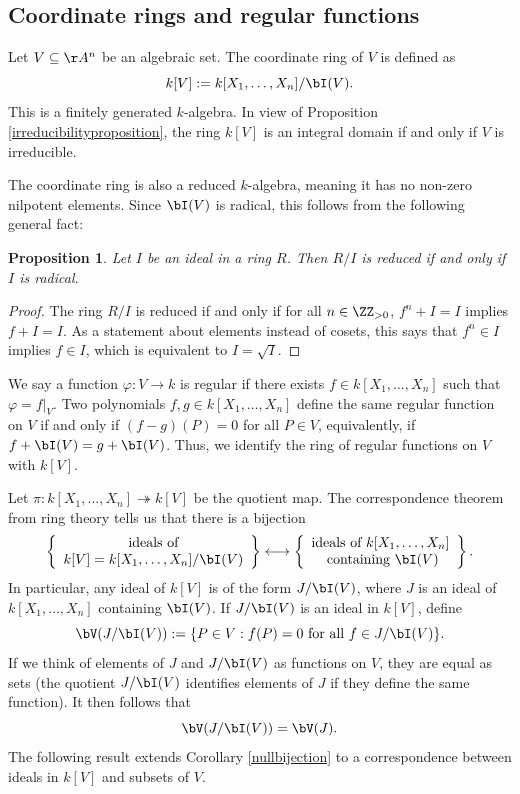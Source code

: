 \documentclass[12pt]{amsart}
\theoremstyle{plain}
\newtheorem{proposition}[theorem]{Proposition}
\begin{document}
\subsection{Coordinate rings and regular functions}
Let $V \subseteq \AA^n$ be an algebraic set.
The coordinate ring of $V$ is defined as
$$k[V] := k[X_1, \ldots, X_n] / \bI(V).$$
This is a finitely generated $k$-algebra.
In view of Proposition \ref{irreducibilityproposition}, the ring $k[V]$ is an integral domain if and only if $V$ is irreducible.

The coordinate ring is also a reduced $k$-algebra, meaning it has no non-zero nilpotent elements.
Since $\bI(V)$ is radical, this follows from the following general fact:

\begin{proposition}\label{reducedradical}
Let $I$ be an ideal in a ring $R$.
Then $R/I$ is reduced if and only if $I$ is radical.
\end{proposition}
\begin{proof}
The ring $R/I$ is reduced if and only if for all $n \in \ZZ_{> 0}$, $f^n + I = I$ implies $f + I = I$.
As a statement about elements instead of cosets, this says that $f^n \in I$ implies $ f \in I$, which is equivalent to $I = \sqrt{I}$.
\end{proof}

We say a function $\varphi \colon V \to k$ is regular if there exists $f \in k[X_1, \ldots, X_n]$ such that $\varphi = \left. f \right|_V$.
Two polynomials $f, g \in k[X_1, \ldots, X_n]$ define the same regular function on $V$ if and only if $(f- g)(P) = 0$ for all $P \in V$,
equivalently, if $f + \bI(V) = g + \bI(V)$.
Thus, we identify the ring of regular functions on $V$ with $k[V]$.

Let $\pi : k[X_1, \ldots, X_n] \twoheadrightarrow k[V]$ be the quotient map.
The correspondence theorem from ring theory tells us that there is a bijection
\begin{align}\label{ringidealbijection}
\left\{
\begin{array}{c}
	\text{ideals of} \\
	k[V]=k[X_1,\ldots,X_n]/\bI(V)
\end{array}
\right\} \longleftrightarrow 
\left\{
\begin{array}{c}
	\text{ideals of } k[X_1, \ldots, X_n] \\
	\text{ containing } \bI(V)
\end{array}
\right\}.
\end{align}
In particular, any ideal of $k[V]$ is of the form $J/\bI(V)$, where $J$ is an ideal of $k[X_1, \ldots, X_n]$ containing $\bI(V)$.
If $J / \bI(V)$ is an ideal in $k[V]$, define
$$\bV(J/\bI(V)) := \{P \in V : f(P) = 0 \text{ for all } f \in J/\bI(V)\}.$$
If we think of elements of $J$ and $J/\bI(V)$ as functions on $V$, they are equal as sets (the quotient $J/\bI(V)$ identifies elements of $J$ if they define the same function).
It then follows that
$$\bV(J/\bI(V)) = \bV(J).$$
The following result extends Corollary \ref{nullbijection} to a correspondence between ideals in $k[V]$ and subsets of $V$.
\end{document}
